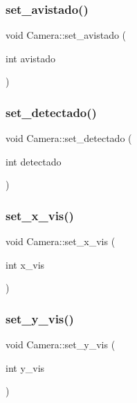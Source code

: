 \mbox{\label{classCamera_a8f9f20cce133ec8f429f56e805ba1510}} 
\subsubsection{\texorpdfstring{set\+\_\+avistado()}{set\_avistado()}}
{\footnotesize\ttfamily void Camera\+::set\+\_\+avistado (\begin{DoxyParamCaption}\item[{int}]{avistado }\end{DoxyParamCaption})}

\mbox{\label{classCamera_a809224178bedeb0b951891f91c0a5f58}} 
\subsubsection{\texorpdfstring{set\+\_\+detectado()}{set\_detectado()}}
{\footnotesize\ttfamily void Camera\+::set\+\_\+detectado (\begin{DoxyParamCaption}\item[{int}]{detectado }\end{DoxyParamCaption})}

\mbox{\label{classCamera_abf6eb324c8d3900835e542a5ff5f9d43}} 
\subsubsection{\texorpdfstring{set\+\_\+x\+\_\+vis()}{set\_x\_vis()}}
{\footnotesize\ttfamily void Camera\+::set\+\_\+x\+\_\+vis (\begin{DoxyParamCaption}\item[{int}]{x\+\_\+vis }\end{DoxyParamCaption})}

\mbox{\label{classCamera_aea3c7f010360c4fe13ac738be2ea9027}} 
\subsubsection{\texorpdfstring{set\+\_\+y\+\_\+vis()}{set\_y\_vis()}}
{\footnotesize\ttfamily void Camera\+::set\+\_\+y\+\_\+vis (\begin{DoxyParamCaption}\item[{int}]{y\+\_\+vis }\end{DoxyParamCaption})}



